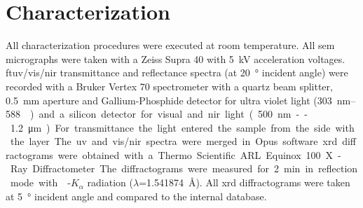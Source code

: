 \section{Characterization}
All characterization procedures were executed at room temperature.
All \gls{sem} micrographs were taken with a Zeiss Supra 40 with  \SI{5}{\kilo\volt} acceleration voltages.
\Gls{ft}\gls{uv}/\gls{vis}/\gls{nir} transmittance and reflectance spectra (at \SI{20}{\degree} incident 
angle) were recorded with a Bruker Vertex 70 
spectrometer with a quartz beam splitter, \SI{0.5}{\milli\meter} aperture and 
Gallium-Phosphide detector for ultra violet light (\SI{303}{\nano\meter}--\SI{588}
{\nano\meter}) and a silicon detector for visual and \gls{nir} light 
(\SI{500}{\nano\meter}--\SI{1.2}{\micro\meter}). For transmittance the light
entered the sample from the side with the layer. The \gls{uv} and \gls{vis}/\gls{nir} spectra were merged 
in Opus software. %
\Gls{xrd} diffractograms were obtained with a Thermo Scientific ARL Equinox 100 X-Ray Diffractometer.
The diffractograms were measured for \SI{2}{\minute} in reflection mode with -$K_{\alpha}$ radiation ($\lambda$=\SI{1.541874}{\angstrom}).
All \gls{xrd} diffractograms were taken at \SI{5}{\degree} incident angle and compared to the internal database.

